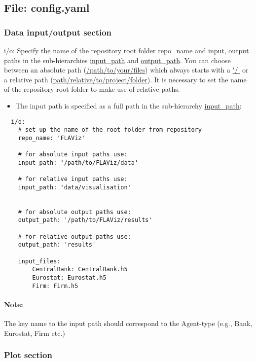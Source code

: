 \documentclass[10pt,a4paper]{article}
\begin{document}
\subsection{File: config.yaml}

\subsubsection*{Data input/output section}

\url{i/o}: Specify the name of the repository root folder \url{repo_name} and input, output paths in the sub-hierarchies \url{input_path} and \url{output_path}. You can choose between an absolute path (\url{/path/to/your/files}) which always starts with a \url{'/'} or a relative path (\url{path/relative/to/project/folder}). It is necessary to set the name of the repository root folder to make use of relative paths.

\begin{itemize}
    \item The input path is specified as a full path in the sub-hierarchy \url{input_path}:
\end{itemize}

\lstset{language=C,frame=single, basicstyle=\footnotesize}
\begin{lstlisting}
  i/o:
    # set up the name of the root folder from repository    
    repo_name: 'FLAViz'

    # for absolute input paths use:
    input_path: '/path/to/FLAViz/data'

    # for relative input paths use:
    input_path: 'data/visualisation'


    # for absolute output paths use:
    output_path: '/path/to/FLAViz/results'

    # for relative output paths use:
    output_path: 'results'
    
    input_files:
        CentralBank: CentralBank.h5
        Eurostat: Eurostat.h5
        Firm: Firm.h5
\end{lstlisting}
\paragraph{Note:} The key name to the input path should correspond to the Agent-type (e.g., Bank, Eurostat, Firm etc.)

\clearpage
\subsubsection*{Plot section}
\end{document}
